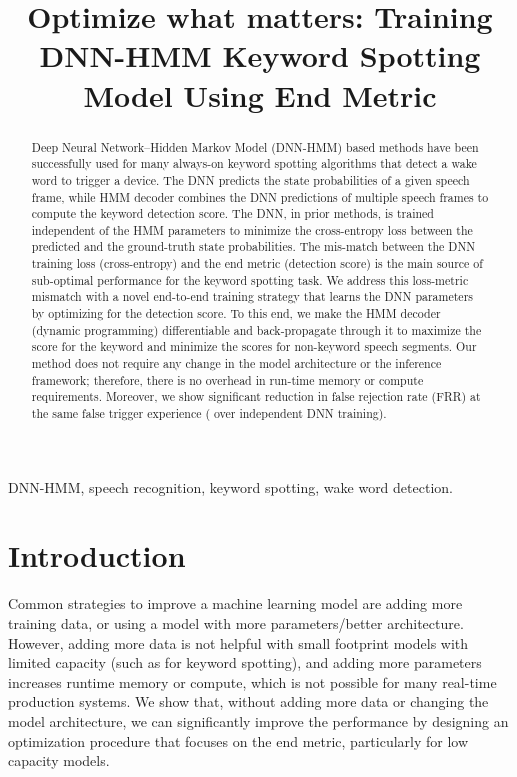 \documentclass{article}
\title{Optimize what matters: Training DNN-HMM Keyword Spotting Model Using End Metric}
\begin{document}
\maketitle
\begin{abstract}
Deep Neural Network--Hidden Markov Model (DNN-HMM) based methods have been successfully used for many always-on keyword spotting algorithms that detect a wake word to trigger a device.
The DNN predicts the state probabilities of a given speech frame, while HMM  decoder combines the DNN predictions of multiple speech frames to compute the keyword detection score.
The DNN, in prior methods, is trained independent of the HMM parameters to minimize the cross-entropy loss between the predicted and the ground-truth state probabilities.
The mis-match between the DNN training loss (cross-entropy) and the end metric (detection score) is the main source of sub-optimal performance for the keyword spotting task.
We address this loss-metric mismatch with a novel end-to-end training strategy that learns the DNN parameters by optimizing for the detection score.
To this end, we make the HMM decoder (dynamic programming) differentiable and back-propagate through it to maximize the score for the keyword and minimize the scores for non-keyword speech segments.
Our method does not require any change in the model architecture or the inference framework; therefore, there is no overhead in run-time memory or compute requirements.
Moreover, we show significant reduction in false rejection rate (FRR) at the same false trigger experience ( over independent DNN training).




 \end{abstract}

\begin{keywords}
DNN-HMM, speech recognition, keyword spotting, wake word detection.
\end{keywords}
\section{Introduction}
Common strategies to improve a machine learning model are adding more training data, or using a model with more parameters/better architecture.
However, adding more data is not helpful with small footprint models with limited capacity (such as for keyword spotting), and adding more parameters increases runtime memory or compute, which is not possible for many real-time production systems.
We show that, without adding more data or changing the model architecture, we can significantly improve the performance by designing an optimization procedure that focuses on the end metric, particularly for low capacity models.
\end{document}
